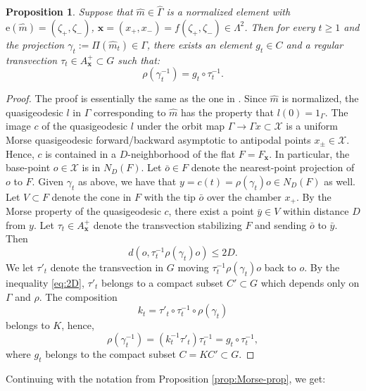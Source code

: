 \documentclass[12pt]{amsbook}%
\newtheorem{prop}[thm]{Proposition}
\theoremstyle{definition}
\theoremstyle{remark}
\numberwithin{section}{chapter}
\numberwithin{subsection}{section}
\numberwithin{figure}{chapter}
\def\cX{{\mathscr{X}}}
\def\bx{\mathbf{x}}
\def\re{\mathrm{e}}
\def\Ga{\Gamma}
\def\ga{\gamma}
\def\La{\Lambda}
\def\la{\lambda}
\begin{document}
{{\begin{prop}
Suppose that $\hat m\in \widehat\Ga$ is a normalized element with $\re(\hat m)=(\zeta_+,\zeta_-)$, $\bx=(x_+,x_-)=f(\zeta_+,\zeta_-)\in \La^2$.
 Then for every $t\geqslant 1$ and the projection 
$\ga_t:= \Pi(\hat m_t)\in \Ga$, there exists an element $g_t\in  C$ and a regular transvection $\tau_t\in A^+_{\bx} \subset G$ %
such that:
$$
\rho(\ga^{-1}_t)=g_t \circ \tau_t^{-1}.    
$$
\end{prop}
\begin{proof} The proof is essentially the same as the one in \cite[Theorem 2.41]{KLP17}. 
Since $\hat m$ is normalized, the quasigeodesic $l$ in $\Ga$ corresponding to $\hat m$ has the property that $l(0)=1_\Ga$. The image $c$ of the quasigeodesic $l$ under the orbit map $\Ga\to \Ga x\subset \cX$ is a uniform Morse quasigeodesic forward/backward asymptotic to antipodal 
points $x_\pm\in \cX$. Hence, $c$ is contained in a $D$-neighborhood of the flat $F=F_{\bx}$. In particular, the base-point $o\in \cX$ is in $N_D(F)$. 
Let $\bar{o}\in F$ denote the nearest-point projection of $o$ to $F$. Given $\gamma_t$ as above, we have that $y=c(t)=\rho(\ga_t)o\in N_D(F)$ as well.   
Let $V\subset F$ denote the cone in $F$ with the tip $\bar{o}$ over the chamber $x_+$. 
By the Morse property of the quasigeodesic $c$, there exist a point $\bar{y}\in V$ within distance $D$ from $y$. Let $\tau_t\in A^+_{\bx}$ denote the transvection stabilizing $F$ and sending $\bar{o}$ to $\bar{y}$.  Then 
\begin{equation}\label{eq:2D}
d(o, \tau_t^{-1}\rho(\ga_t) o)\leqslant 2D. 
\end{equation}
We let $\tau'_t$ denote the transvection in $G$ moving $\tau_t^{-1}\rho(\ga_t) o$ back to $o$. By the inequality \eqref{eq:2D}, $\tau'_t$ belongs to a compact subset $C'\subset G$ which depends only on $\Ga$ and $\rho$. The composition
$$
k_t= \tau'_t \circ \tau_t^{-1}\circ \rho(\ga_t) 
$$
belongs to $K$, hence, 
$$
\rho(\ga^{-1}_t)= (k_t^{-1}\tau'_t)  \tau_t^{-1} = g_t\circ \tau_t^{-1}, 
$$
where $g_t$ belongs to the compact subset $C=KC'\subset G$. 
\end{proof}



Continuing with the notation from Proposition \ref{prop:Morse-prop}, we get: 

}}
\end{document}
